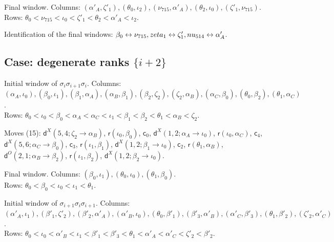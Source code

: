 \documentclass[11pt]{amsart}
\theoremstyle{definition}
\theoremstyle{remark}
\begin{document}
\noindent Final window. Columns: $(\alpha'_A,\zeta'_1),\allowbreak (\theta_0,\iota_2),\allowbreak (\nu_{715},\alpha'_A),\allowbreak (\theta_2,\iota_0),\allowbreak (\zeta'_1,\nu_{715})$.\\ Rows: $\theta_0 <\allowbreak \nu_{715} <\allowbreak \iota_0 <\allowbreak \zeta'_1 <\allowbreak \theta_2 <\allowbreak \alpha'_A <\allowbreak \iota_2$.\par\medskip
\noindent Identification of the final windows: $\beta_0\leftrightarrow \nu_{715},\allowbreak \\zeta_1\leftrightarrow \zeta'_1,\allowbreak \\nu_{514}\leftrightarrow \alpha'_A$.\par\bigskip
\subsection*{Case: degenerate ranks \texorpdfstring{$\{i+2\}$}{i+2}}
\noindent Initial window of $\sigma_i\sigma_{i+1}\sigma_i$. Columns: $(\alpha_A,\iota_0),\allowbreak (\beta_0,\iota_1),\allowbreak (\beta_1,\alpha_A),\allowbreak (\alpha_B,\beta_1),\allowbreak (\beta_2,\zeta_2),\allowbreak (\zeta_2,\alpha_B),\allowbreak (\alpha_C,\beta_0),\allowbreak (\theta_0,\beta_2),\allowbreak (\theta_1,\alpha_C)$.\\ Rows: $\theta_0 <\allowbreak \iota_0 <\allowbreak \beta_0 <\allowbreak \alpha_A <\allowbreak \alpha_C <\allowbreak \iota_1 <\allowbreak \beta_1 <\allowbreak \beta_2 <\allowbreak \theta_1 <\allowbreak \alpha_B <\allowbreak \zeta_2$.\par
\noindent Moves (15): $\mathsf{d}^{X}(5,4;\zeta_2\to\alpha_B)$, $\mathsf{r}(\iota_0,\beta_0)$, $\mathsf{c}_{0}$, $\mathsf{d}^{X}(1,2;\alpha_A\to\iota_0)$, $\mathsf{r}(\iota_0,\alpha_C)$, $\mathsf{c}_{4}$, $\mathsf{d}^{X}(5,6;\alpha_C\to\beta_0)$, $\mathsf{c}_{3}$, $\mathsf{r}(\iota_1,\beta_1)$, $\mathsf{d}^{X}(1,2;\beta_1\to\iota_0)$, $\mathsf{c}_{2}$, $\mathsf{r}(\theta_1,\alpha_B)$, $\mathsf{d}^{O}(2,1;\alpha_B\to\beta_2)$, $\mathsf{r}(\iota_1,\beta_2)$, $\mathsf{d}^{X}(1,2;\beta_2\to\iota_0)$.\par
\noindent Final window. Columns: $(\beta_0,\iota_1),\allowbreak (\theta_0,\iota_0),\allowbreak (\theta_1,\beta_0)$.\\ Rows: $\theta_0 <\allowbreak \beta_0 <\allowbreak \iota_0 <\allowbreak \iota_1 <\allowbreak \theta_1$.\par\medskip
\noindent Initial window of $\sigma_{i+1}\sigma_i\sigma_{i+1}$. Columns: $(\alpha'_A,\iota_1),\allowbreak (\beta'_1,\zeta'_2),\allowbreak (\beta'_2,\alpha'_A),\allowbreak (\alpha'_B,\iota_0),\allowbreak (\theta_0,\beta'_1),\allowbreak (\beta'_3,\alpha'_B),\allowbreak (\alpha'_C,\beta'_3),\allowbreak (\theta_1,\beta'_2),\allowbreak (\zeta'_2,\alpha'_C)$.\\ Rows: $\theta_0 <\allowbreak \iota_0 <\allowbreak \alpha'_B <\allowbreak \iota_1 <\allowbreak \beta'_1 <\allowbreak \beta'_3 <\allowbreak \theta_1 <\allowbreak \alpha'_A <\allowbreak \alpha'_C <\allowbreak \zeta'_2 <\allowbreak \beta'_2$.\par
\end{document}
